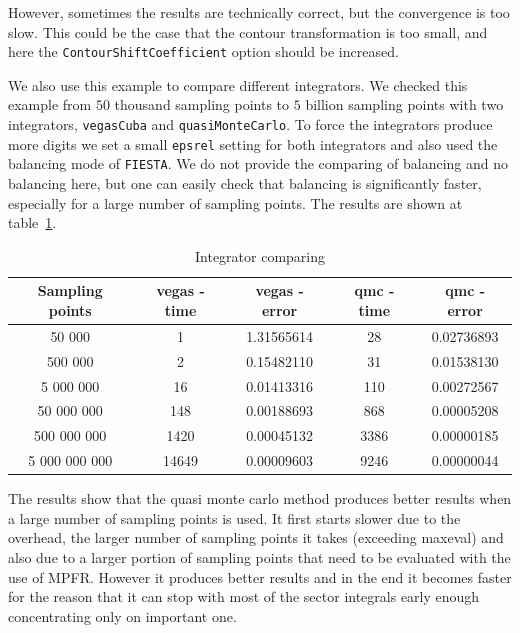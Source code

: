 \documentclass[preprint,12pt]{elsarticle}
\begin{document}
However, sometimes the results are technically correct, but the convergence is too slow. This could be the case that the contour transformation is too small, and here the {\tt ContourShiftCoefficient} option should be increased.

We also use this example to compare different integrators. We checked this example from $50$ thousand sampling points to $5$ billion sampling points with two integrators, {\tt vegasCuba} and {\tt quasiMonteCarlo}. To force the integrators produce more digits we set a small {\tt epsrel} setting for both integrators and also used the balancing mode of {\tt FIESTA}. We do not provide the comparing of balancing and no balancing here, but one can easily check that balancing is significantly faster, especially for a large number of sampling points. The results are shown at table~\ref{integrators}.

\begin{table}[ht]
\begin{center}
 \begin{tabular}{|c|c|c|c|c|}
 \hline
 Sampling points   & vegas - time &  vegas - error & qmc - time & qmc - error   \\
 \hline
       50 000      &          1   &  1.31565614    &         28 &  0.02736893   \\
      500 000      &          2   &  0.15482110    &         31 &  0.01538130   \\
    5 000 000      &         16   &  0.01413316    &        110 &  0.00272567   \\
   50 000 000      &        148   &  0.00188693    &        868 &  0.00005208   \\
  500 000 000      &       1420   &  0.00045132    &       3386 &  0.00000185   \\
5 000 000 000      &      14649   &  0.00009603    &       9246 &  0.00000044   \\
 \hline
 \end{tabular}
 
 \caption{Integrator comparing\label{integrators}}
 \end{center}
\end{table}

The results show that the quasi monte carlo method produces better results when a large number of sampling points is used. It first starts slower due to the overhead, the larger number of sampling points it takes (exceeding maxeval) and also due to a larger portion of sampling points that need to be evaluated with the use of MPFR. However it produces better results and in the end it becomes faster for the reason that it can stop with most of the sector integrals early enough concentrating only on important one.
\end{document}
